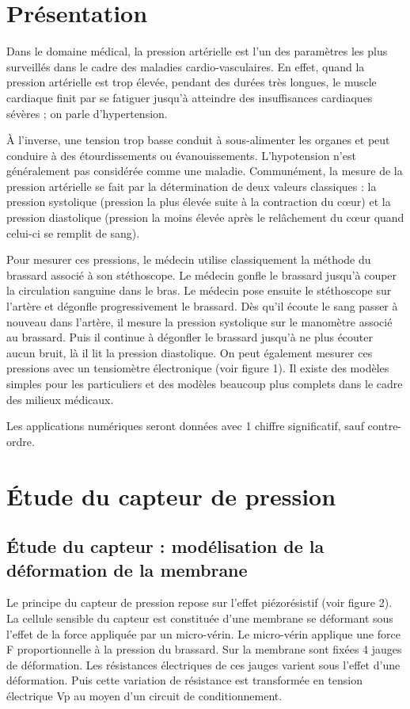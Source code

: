 \documentclass[10pt,fleqn]{article} %
\begin{document}

\vspace{1cm}
\pagestyle{fancy}
\thispagestyle{plain}

\section{Présentation}
Dans le domaine médical, la pression artérielle est l'un des paramètres
les plus surveillés dans le cadre des maladies cardio-vasculaires. En effet,
quand la pression artérielle est trop élevée, pendant des durées très longues,
le muscle cardiaque finit par se fatiguer jusqu'à atteindre des insuffisances
cardiaques sévères ; on parle d'hypertension.

À l'inverse, une tension trop basse conduit à sous-alimenter les organes
et peut conduire à des étourdissements ou évanouissements. L'hypotension
n'est généralement pas considérée comme une maladie.
Communément, la mesure de la pression artérielle se fait par la détermination
de deux valeurs classiques : la pression systolique (pression la plus
élevée suite à la contraction du cœur) et la pression diastolique (pression
la moins élevée après le relâchement du cœur quand celui-ci se remplit de
sang).

Pour mesurer ces pressions, le médecin utilise classiquement la méthode
du brassard associé à son stéthoscope. Le médecin gonfle le brassard jusqu'à
couper la circulation sanguine dans le bras. Le médecin pose ensuite
le stéthoscope sur l'artère et dégonfle progressivement le brassard. Dès qu'il
écoute le sang passer à nouveau dans l'artère, il mesure la pression systolique
sur le manomètre associé au brassard. Puis il continue à dégonfler le
brassard jusqu'à ne plus écouter aucun bruit, là il lit la pression diastolique.
On peut également mesurer ces pressions avec un tensiomètre électronique (voir figure 1).
Il existe des modèles simples pour les particuliers et des modèles beaucoup plus complets dans
le cadre des milieux médicaux.

Les applications numériques seront données avec 1 chiffre significatif, sauf contre-ordre.

\section{Étude du capteur de pression}
\subsection{Étude du capteur : modélisation de la déformation de la membrane}
Le principe du capteur de pression repose sur l'effet piézorésistif (voir figure 2). La cellule
sensible du capteur est constituée d'une membrane se déformant sous l'effet de la force appliquée
par un micro-vérin. Le micro-vérin applique une force F proportionnelle à la pression du
brassard. Sur la membrane sont fixées 4 jauges de déformation. Les résistances électriques de ces
jauges varient sous l'effet d'une déformation. Puis cette variation de résistance est transformée
en tension électrique Vp au moyen d'un circuit de conditionnement.
\end{document}
